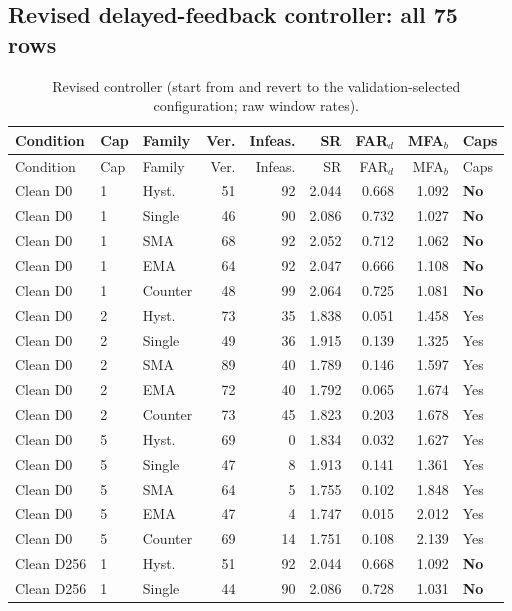 \subsection{Revised delayed-feedback controller: all 75 rows}
{\footnotesize\setlength{\tabcolsep}{4pt}
\begin{longtable}{lllrrrrrl}
\caption{Revised controller (start from and revert to the validation-selected configuration; raw window rates).}\label{tab:s7_dyn75}\\
\toprule
Condition & Cap & Family & Ver. & Infeas. & SR & FAR$_d$ & MFA$_b$ & Caps\\
\midrule
\endfirsthead
\toprule
Condition & Cap & Family & Ver. & Infeas. & SR & FAR$_d$ & MFA$_b$ & Caps\\
\midrule
\endhead
\bottomrule
\endfoot
Clean D0 & 1 & Hyst. & 51 & 92 & 2.044 & 0.668 & 1.092 & \textbf{No}\\
Clean D0 & 1 & Single & 46 & 90 & 2.086 & 0.732 & 1.027 & \textbf{No}\\
Clean D0 & 1 & SMA & 68 & 92 & 2.052 & 0.712 & 1.062 & \textbf{No}\\
Clean D0 & 1 & EMA & 64 & 92 & 2.047 & 0.666 & 1.108 & \textbf{No}\\
Clean D0 & 1 & Counter & 48 & 99 & 2.064 & 0.725 & 1.081 & \textbf{No}\\
Clean D0 & 2 & Hyst. & 73 & 35 & 1.838 & 0.051 & 1.458 & Yes\\
Clean D0 & 2 & Single & 49 & 36 & 1.915 & 0.139 & 1.325 & Yes\\
Clean D0 & 2 & SMA & 89 & 40 & 1.789 & 0.146 & 1.597 & Yes\\
Clean D0 & 2 & EMA & 72 & 40 & 1.792 & 0.065 & 1.674 & Yes\\
Clean D0 & 2 & Counter & 73 & 45 & 1.823 & 0.203 & 1.678 & Yes\\
Clean D0 & 5 & Hyst. & 69 & 0 & 1.834 & 0.032 & 1.627 & Yes\\
Clean D0 & 5 & Single & 47 & 8 & 1.913 & 0.141 & 1.361 & Yes\\
Clean D0 & 5 & SMA & 64 & 5 & 1.755 & 0.102 & 1.848 & Yes\\
Clean D0 & 5 & EMA & 47 & 4 & 1.747 & 0.015 & 2.012 & Yes\\
Clean D0 & 5 & Counter & 69 & 14 & 1.751 & 0.108 & 2.139 & Yes\\
Clean D256 & 1 & Hyst. & 51 & 92 & 2.044 & 0.668 & 1.092 & \textbf{No}\\
Clean D256 & 1 & Single & 44 & 90 & 2.086 & 0.728 & 1.031 & \textbf{No}\\

\end{longtable}}
